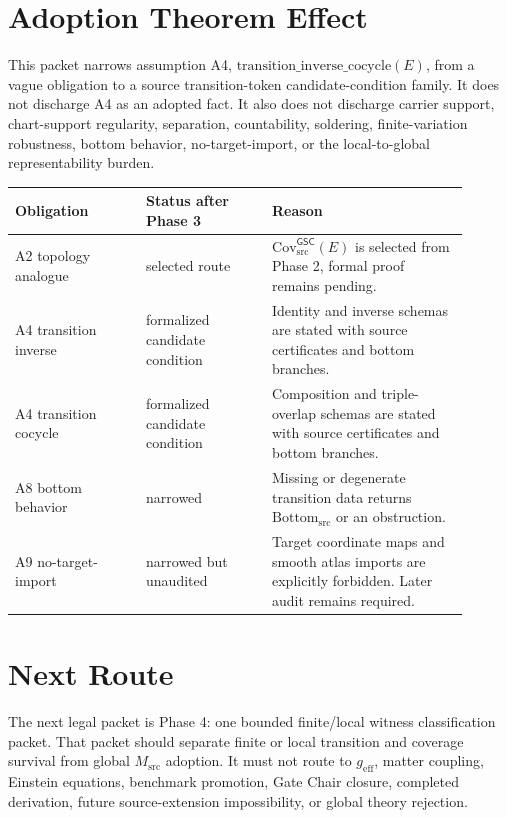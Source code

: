 \documentclass[11pt]{article}
\newcommand{\GSC}{\mathsf{GSC}}
\newcommand{\Msrc}{M_{\mathrm{src}}}
\newcommand{\Bottomsrc}{\mathrm{Bottom}_{\mathrm{src}}}
\newcommand{\Covsrc}{\mathrm{Cov}_{\mathrm{src}}^{\GSC}}
\newcommand{\geff}{g_{\mathrm{eff}}}
\begin{document}
\section{Adoption Theorem Effect}

This packet narrows assumption A4,
\(\mathrm{transition\_inverse\_cocycle}(E)\), from a vague obligation to a
source transition-token candidate-condition family. It does not discharge A4
as an adopted fact. It also does not discharge carrier support, chart-support
regularity, separation, countability, soldering, finite-variation robustness,
bottom behavior, no-target-import, or the local-to-global representability
burden.

\begin{longtable}{|p{0.26\linewidth}|p{0.25\linewidth}|p{0.39\linewidth}|}
\hline
\textbf{Obligation} & \textbf{Status after Phase 3} & \textbf{Reason} \\
\hline
A2 topology analogue & selected route & \(\Covsrc(E)\) is selected from Phase 2, formal proof remains pending. \\
\hline
A4 transition inverse & formalized candidate condition & Identity and inverse schemas are stated with source certificates and bottom branches. \\
\hline
A4 transition cocycle & formalized candidate condition & Composition and triple-overlap schemas are stated with source certificates and bottom branches. \\
\hline
A8 bottom behavior & narrowed & Missing or degenerate transition data returns \(\Bottomsrc\) or an obstruction. \\
\hline
A9 no-target-import & narrowed but unaudited & Target coordinate maps and smooth atlas imports are explicitly forbidden. Later audit remains required. \\
\hline
\end{longtable}

\section{Next Route}

The next legal packet is Phase 4: one bounded finite/local witness
classification packet. That packet should separate finite or local transition
and coverage survival from global \(\Msrc\) adoption. It must not route to
\(\geff\), matter coupling, Einstein equations, benchmark promotion, Gate
Chair closure, completed derivation, future source-extension impossibility,
or global theory rejection.
\end{document}
